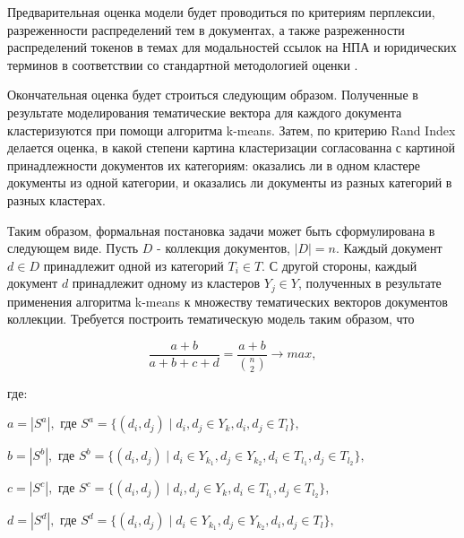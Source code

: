 \documentclass[12pt,twoside]{article}
\begin{document}

Предварительная оценка модели будет проводиться по критериям перплексии, разреженности распределений тем в документах, а также разреженности распределений токенов в темах для модальностей ссылок на НПА и юридических терминов в соответствии со стандартной методологией оценки \cite{vorontsov2015additive}. 

Окончательная оценка будет строиться следующим образом. Полученные в результате моделирования тематические вектора для каждого документа кластеризуются при помощи алгоритма k-means. Затем, по критерию Rand Index делается оценка, в какой степени картина кластеризации согласованна с картиной принадлежности документов их категориям:  оказались ли в одном кластере документы из одной категории, и оказались ли документы из разных категорий в разных кластерах.

Таким образом, формальная постановка задачи может быть сформулирована в следующем виде.
Пусть $D$ - коллекция документов, $|D|=n$. Каждый документ $d\in D$ принадлежит одной из категорий $T_{i}\in T$. С другой стороны, каждый документ $d$ принадлежит одному из кластеров $Y_{j}\in Y$, полученных в результате применения алгоритма k-means к множеству тематических векторов документов коллекции. Требуется построить тематическую модель таким образом, что


\begin{equation}
\frac{a+b}{a+b+c+d} = \frac{a+b}{{n \choose 2 }}\to max,
\end{equation}

где:

$a = |S^{a}|,$ где $S^{a} = \{ (d_{i}, d_{j}) \mid d_{i}, d_{j} \in Y_{k}, d_{i}, d_{j} \in T_{l}\},$

$b = |S^{b}|,$ где $S^{b} = \{ (d_{i}, d_{j}) \mid d_{i} \in Y_{k_{1}}, d_{j} \in Y_{k_{2}}, d_{i} \in T_{l_{1}}, d_{j} \in T_{l_{2}}\},$

$c = |S^{c}|,$ где $S^{c} = \{ (d_{i}, d_{j}) \mid d_{i}, d_{j} \in Y_{k}, d_{i} \in T_{l_{1}}, d_{j} \in T_{l_{2}}\},$

$d = |S^{d}|,$ где $S^{d} = \{ (d_{i}, d_{j}) \mid d_{i} \in Y_{k_{1}}, d_{j} \in Y_{k_{2}}, d_{i}, d_{j} \in T_{l}\},$
\end{document}
